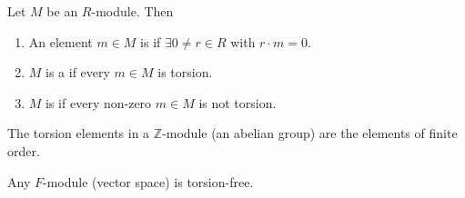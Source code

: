 \documentclass[egregdoesnotlikesansseriftitles,a4paper]{scrartcl}
\begin{document}
\begin{definition*}[Torsion]
       Let $M$ be an $R$-module. Then 
       \begin{enumerate}
             \item An element $m \in M$ is  if $\exists 0 \neq r \in R$ with $r \cdot m=0$.
             \item $M$ is a  if every $m \in M$ is torsion. 
             \item $M$ is  if every non-zero $m \in M$ is not torsion.
       \end{enumerate}
       \begin{example*}
              The torsion elements in a $\mathbb{Z}$-module (an abelian group) are the elements of finite order.

              Any $F$-module (vector space) is torsion-free.
       \end{example*}
\end{definition*}
\newpage
\end{document}
